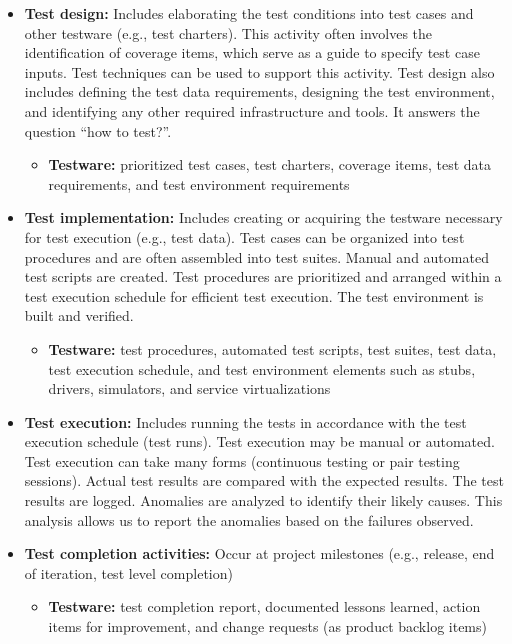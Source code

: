 \documentclass{article}
\begin{document}
\begin{multicols}{3}
{\begin{itemize}
    \item \textbf{Test design:} Includes elaborating the test conditions into test cases and other testware (e.g., test charters). This activity often involves the identification of coverage items, which serve as a guide to specify test case inputs. Test techniques can be used to support this activity. Test design also includes defining the test data requirements, designing the test environment, and identifying any other required infrastructure and tools. It answers the question “how to test?”.
\begin{itemize}
\item \textbf{Testware:}
prioritized test cases, test charters, coverage items, test data requirements, and test environment requirements
\end{itemize} 
    
    \item \textbf{Test implementation:} Includes creating or acquiring the testware necessary for test execution (e.g., test data). Test cases can be organized into test procedures and are often assembled into test suites. Manual and automated test scripts are created. Test procedures are prioritized and arranged within a test execution schedule for efficient test execution. The test environment is built and verified.
\begin{itemize}
\item \textbf{Testware:}
test procedures, automated test scripts, test suites, test data, test execution schedule, and test environment elements such as stubs, drivers, simulators, and service virtualizations
\end{itemize} 
    
    \item \textbf{Test execution:} Includes running the tests in accordance with the test execution schedule (test runs). Test execution may be manual or automated. Test execution can take many forms (continuous testing or pair testing sessions). Actual test results are compared with the expected results. The test results are logged. Anomalies are analyzed to identify their likely causes. This analysis allows us to report the anomalies based on the failures observed.
    
    \item \textbf{Test completion activities:} Occur at project milestones (e.g., release, end of iteration, test level completion) 
\begin{itemize}
\item \textbf{Testware:}
test completion report, documented lessons learned, action items for improvement, and change requests (as product backlog items)
\end{itemize}
\end{itemize} 
}


\end{multicols}
\end{document}
